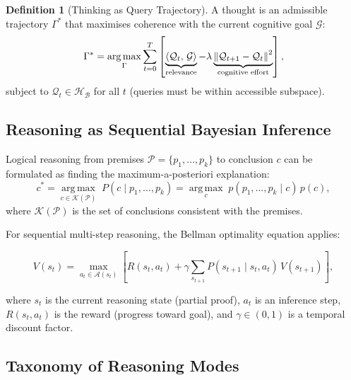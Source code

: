 \documentclass[12pt,a4paper]{article}
\theoremstyle{plain}
\theoremstyle{definition}
\newtheorem{definition}[theorem]{Definition}
\theoremstyle{remark}
\newcommand{\vH}{\mathcal{H}}
\newcommand{\vB}{\mathcal{B}}
\newcommand{\vQ}{\mathcal{Q}}
\newcommand{\inner}[2]{\left\langle#1,\,#2\right\rangle}
\newcommand{\argmax}{\operatorname*{arg\,max}}
\begin{document}
\begin{definition}[Thinking as Query Trajectory]
A thought is an admissible trajectory $\Gamma^*$ that maximises coherence with the current cognitive goal $\mathcal{G}$:
\begin{equation}
  \Gamma^* = \argmax_{\Gamma} \sum_{t=0}^{T} \left[
    \underbrace{\inner{\vQ_t}{\mathcal{G}}}_{\text{relevance}} -
    \lambda\underbrace{\norm{\vQ_{t+1} - \vQ_t}^2}_{\text{cognitive effort}}
  \right],
  \label{eq:thought_trajectory}
\end{equation}
subject to $\vQ_t \in \vH_\vB$ for all $t$ (queries must be within accessible subspace).
\end{definition}

\subsection{Reasoning as Sequential Bayesian Inference}

Logical reasoning from premises $\mathcal{P} = \{p_1, \ldots, p_k\}$ to conclusion $c$ can be formulated as finding the maximum-a-posteriori explanation:
\begin{equation}
  c^* = \argmax_{c \in \mathcal{K}(\mathcal{P})} \; P(c \mid p_1, \ldots, p_k)
      = \argmax_{c} \; p(p_1, \ldots, p_k \mid c)\,p(c),
  \label{eq:map_reasoning}
\end{equation}
where $\mathcal{K}(\mathcal{P})$ is the set of conclusions consistent with the premises.

For sequential multi-step reasoning, the Bellman optimality equation applies:
\begin{tcolorbox}[mathbox, title={Bellman Equation for Reasoning}]
\begin{equation}
  V(s_t) = \max_{a_t \in \mathcal{A}(s_t)} \left[
    R(s_t, a_t) + \gamma \sum_{s_{t+1}} P(s_{t+1} \mid s_t, a_t)\,V(s_{t+1})
  \right],
  \label{eq:bellman}
\end{equation}
\end{tcolorbox}
where $s_t$ is the current reasoning state (partial proof),
$a_t$ is an inference step,
$R(s_t,a_t)$ is the reward (progress toward goal), and
$\gamma \in (0,1)$ is a temporal discount factor.

\subsection{Taxonomy of Reasoning Modes}
\end{document}
